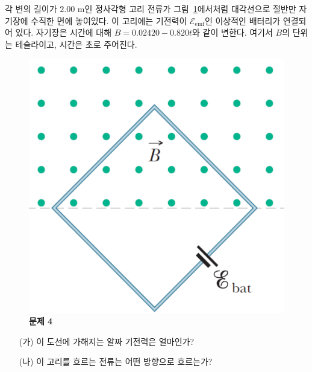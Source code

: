 \documentclass[tightenlines,floatfix,nofootinbib,superscriptaddress,fleqn]{revtex4}
\begin{document}
각 변의 길이가 $2.00$ m인 정사각형 고리 전류가
그림~\ref{fig:2}에서처럼 대각선으로 절반만 자기장에 수직한 면에 
놓여있다. 이 고리에는 기전력이 $\mathcal{E}_{\mathrm{emf}}$인 이상적인
배터리가 연결되어 있다. 자기장은 시간에 대해 $B=0.02420-0.820t$와 같이
변한다. 여기서 $B$의 단위는 테슬라이고, 시간은 초로 주어진다. 
\begin{figure}[htp]
  \centering
  \includegraphics[scale=0.4]{qfig10-20221005-2.pdf}
  \caption{\textbf{문제 4}}
  \label{fig:2}
\end{figure}
\begin{itemize}
\item[(가)] 이 도선에 가해지는 알짜 기전력은 얼마인가?  
\item[(나)] 이 고리를 흐르는 전류는 어떤 방향으로 흐르는가? 
\end{itemize}
\vspace{1cm}
\end{document}
